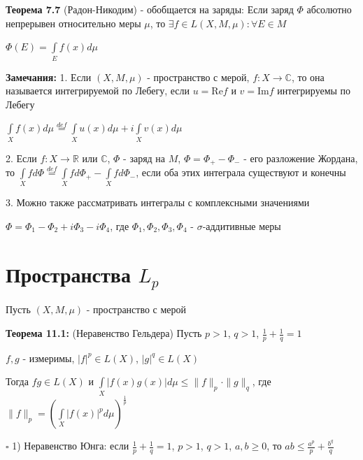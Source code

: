 \documentclass[a4paper]{report}
\begin{document}
\noindent\textbf{Теорема 7.7} (Радон-Никодим) - обобщается на заряды: Если заряд $\Phi$ абсолютно непрерывен относительно меры $\mu$, то $\exists f\in L(X,M,\mu)\colon\forall E\in M$

$\Phi(E)=\displaystyle\int\limits_Ef(x)d\mu$
\bigskip

\noindent\textbf{Замечания:} 1. Если $(X,M,\mu)$ - пространство с мерой, $f\colon X\to\mathbb C$, то она называется интегрируемой по Лебегу, если $u=\mathrm{Re}f$ и $v=\mathrm{Im}f$ интегрируемы по Лебегу

$\displaystyle\int\limits_Xf(x)d\mu\stackrel{def}{=}\displaystyle\int\limits_X u(x)d\mu+i\displaystyle\int\limits_X v(x)d\mu$

2. Если $f\colon X\to\mathbb R$ или $\mathbb C$, $\Phi$ - заряд на $M$, $\Phi=\Phi_+-\Phi_-$ - его разложение Жордана, то $\displaystyle\int\limits_X fd\Phi
\stackrel{def}{=}\displaystyle\int\limits_X fd\Phi_+-\displaystyle\int\limits_Xfd\Phi_-$, если оба этих интеграла существуют и конечны

3. Можно также рассматривать интегралы с комплексными значениями

$\Phi=\Phi_1-\Phi_2+i\Phi_3-i\Phi_4$, где $\Phi_1,\Phi_2,\Phi_3,\Phi_4$ - $\sigma$-аддитивные меры






\chapter{Пространства $L_p$}

Пусть $(X,M,\mu)$ - пространство с мерой

\noindent\textbf{Теорема 11.1:} (Неравенство Гельдера) Пусть $p>1$, $q>1$, $\frac1p+\frac1q=1$

$f,g$ - измеримы, $|f|^p\in L(X)$, $|g|^q\in L(X)$

Тогда $fg\in L(X)$ и $\displaystyle\int\limits_X|f(x)g(x)|d\mu\le\|f\|_p\cdot\|g\|_q$, где $\|f\|_p=\left(\displaystyle\int\limits_X|f(x)|^pd\mu\right)^{\frac1p}$

\noindent $\square$ 1) Неравенство Юнга: если $\frac1p+\frac1q=1$, $p>1$, $q>1$, $a,b\ge0$, то $ab\le\frac{a^p}{p}+\frac{b^q}{q}$
\end{document}

